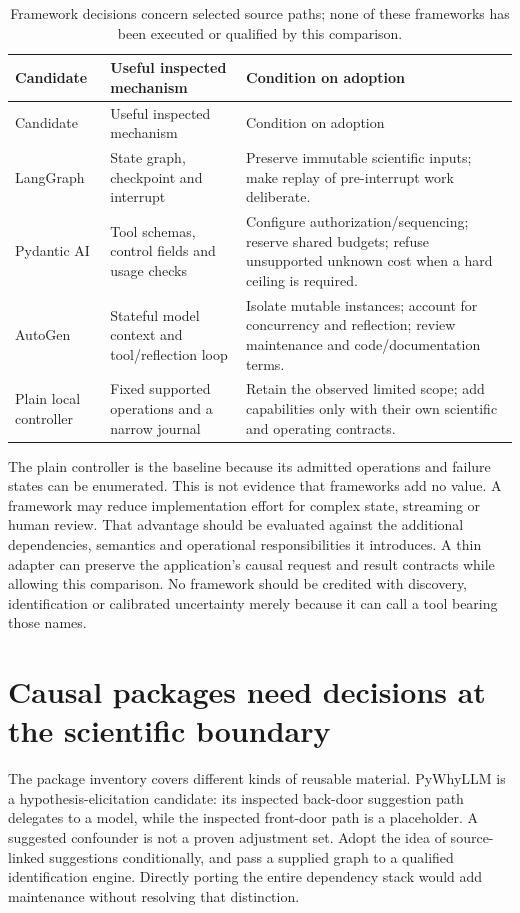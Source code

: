 \begin{longtable}{@{}p{}p{}p{}@{}}
\caption{Framework decisions concern selected source paths; none of these
frameworks has been executed or qualified by this comparison.}\\
\toprule Candidate & Useful inspected mechanism & Condition on adoption\\\midrule
\endfirsthead
\toprule Candidate & Useful inspected mechanism & Condition on adoption\\\midrule
\endhead
LangGraph & State graph, checkpoint and interrupt & Preserve immutable
scientific inputs; make replay of pre-interrupt work deliberate.\\
Pydantic AI & Tool schemas, control fields and usage checks & Configure
authorization/sequencing; reserve shared budgets; refuse unsupported unknown
cost when a hard ceiling is required.\\
AutoGen & Stateful model context and tool/reflection loop & Isolate mutable
instances; account for concurrency and reflection; review maintenance and
code/documentation terms.\\
Plain local controller & Fixed supported operations and a narrow journal &
Retain the observed limited scope; add capabilities only with their own
scientific and operating contracts.\\
\bottomrule
\end{longtable}

The plain controller is the baseline because its admitted operations and
failure states can be enumerated. This is not evidence that frameworks add
no value. A framework may reduce implementation effort for complex state,
streaming or human review. That advantage should be evaluated against the
additional dependencies, semantics and operational responsibilities it
introduces. A thin adapter can preserve the application's causal request
and result contracts while allowing this comparison. No framework should
be credited with discovery, identification or calibrated uncertainty merely
because it can call a tool bearing those names.

\section{Causal packages need decisions at the scientific boundary}

The package inventory covers different kinds of reusable material. PyWhyLLM
is a hypothesis-elicitation candidate: its inspected back-door suggestion
path delegates to a model, while the inspected front-door path is a
placeholder. A suggested confounder is not a proven adjustment set. Adopt
the idea of source-linked suggestions conditionally, and pass a supplied
graph to a qualified identification engine. Directly porting the entire
dependency stack would add maintenance without resolving that distinction.
\cite{v12_la_package_pywhy_llm}

